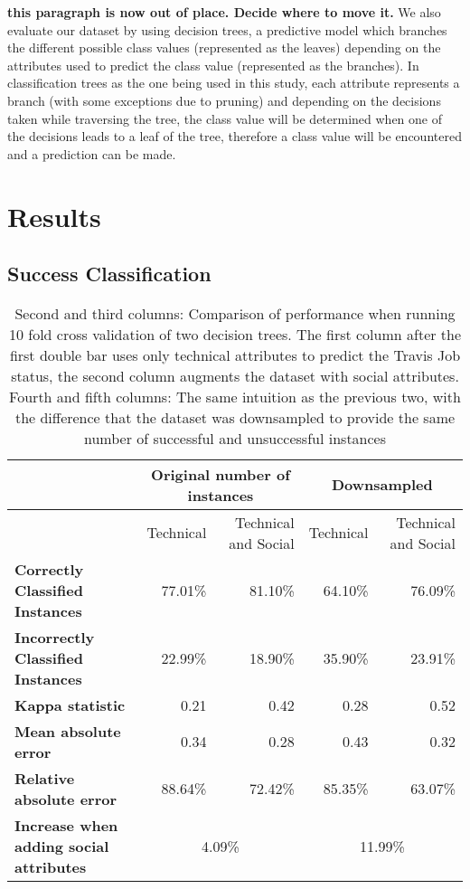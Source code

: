 \documentclass[10pt, conference]{IEEEtran}
\newcommand{\todo}[1]
  {{\scriptsize \textbf{\color{red} {#1}}}}
\begin{document}
\todo{this paragraph is now out of place.  Decide where to move it.}
We also evaluate our dataset by using decision trees, a predictive model which 
branches the different possible class values (represented as the leaves) 
depending on the attributes used to predict the class value (represented as the 
branches). In classification trees as the one being used in this study, each 
attribute represents a branch (with some exceptions due to pruning) and 
depending on the decisions taken while traversing the tree, the class value will 
be determined when one of the decisions leads to a leaf of the tree, therefore a 
class value will be encountered and a prediction can be made.




\section{Results}

\subsection{Success Classification}
\begin{table*}[ht]
\centering
\begin{tabular}{l||r|r||r|r}
  & \multicolumn{2}{|c||}{Original number of instances}  & \multicolumn{2}{|c}{Downsampled} \\
\hline
  & Technical & Technical and Social & Technical & Technical and Social \\
\hline
\textbf{Correctly Classified Instances}&  77.01\% & 81.10\%  & 64.10\% & 76.09\%\\

\textbf{Incorrectly Classified Instances}&  22.99\% & 18.90\% & 35.90\% & 23.91\%\\

\textbf{Kappa statistic}& 0.21 &  0.42 & 0.28  & 0.52 \\

\textbf{Mean absolute error}& 0.34 &  0.28 & 0.43 & 0.32\\

\textbf{Relative absolute error}& 88.64\% & 72.42\%  & 85.35\% & 63.07\%\\
\hline
\textbf{Increase when adding social attributes}& \multicolumn{2}{|c||}{4.09\%}  & \multicolumn{2}{|c}{11.99\%}\\

\hline
\end{tabular}
\\
\center
  \caption{ Second and third columns: Comparison of performance when running 10 fold cross validation of two decision trees. The first column after the first double bar uses only technical attributes to predict the Travis Job status, the second column augments the dataset with social attributes. Fourth and fifth columns: The same intuition as the previous two, with the difference that the dataset was downsampled to provide the same number of successful and unsuccessful instances }
  \label{resultsTable}
\end{table*} 
\end{document}
